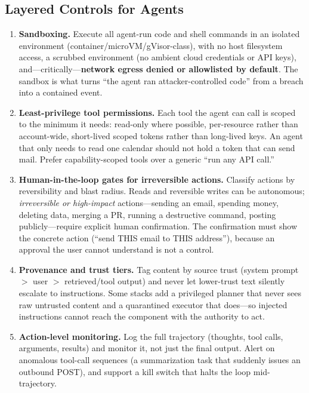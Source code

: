 \subsection{Layered Controls for Agents}

\begin{enumerate}
    \item \textbf{Sandboxing.} Execute all agent-run code and shell commands in an isolated environment (container/microVM/gVisor-class), with no host filesystem access, a scrubbed environment (no ambient cloud credentials or API keys), and---critically---\textbf{network egress denied or allowlisted by default}. The sandbox is what turns ``the agent ran attacker-controlled code'' from a breach into a contained event.
    \item \textbf{Least-privilege tool permissions.} Each tool the agent can call is scoped to the minimum it needs: read-only where possible, per-resource rather than account-wide, short-lived scoped tokens rather than long-lived keys. An agent that only needs to read one calendar should not hold a token that can send mail. Prefer capability-scoped tools over a generic ``run any API call.''
    \item \textbf{Human-in-the-loop gates for irreversible actions.} Classify actions by reversibility and blast radius. Reads and reversible writes can be autonomous; \textit{irreversible or high-impact} actions---sending an email, spending money, deleting data, merging a PR, running a destructive command, posting publicly---require explicit human confirmation. The confirmation must show the concrete action (``send THIS email to THIS address''), because an approval the user cannot understand is not a control.
    \item \textbf{Provenance and trust tiers.} Tag content by source trust (system prompt $>$ user $>$ retrieved/tool output) and never let lower-trust text silently escalate to instructions. Some stacks add a privileged planner that never sees raw untrusted content and a quarantined executor that does---so injected instructions cannot reach the component with the authority to act.
    \item \textbf{Action-level monitoring.} Log the full trajectory (thoughts, tool calls, arguments, results) and monitor it, not just the final output. Alert on anomalous tool-call sequences (a summarization task that suddenly issues an outbound POST), and support a kill switch that halts the loop mid-trajectory.
\end{enumerate}

